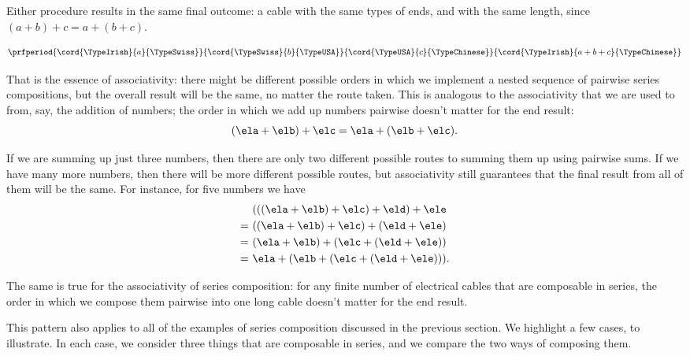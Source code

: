 Either procedure results in the same final outcome: a cable with the same types of ends, and with the same length, since $(a+b)+c = a+(b+c)$. 

\begin{equation}
    \label{eq:cables-assoc-all}
    \prfperiod{
        \cord{\TypeIrish}{a}{\TypeSwiss}
    }{
        \cord{\TypeSwiss}{b}{\TypeUSA}
    }{
        \cord{\TypeUSA}{c}{\TypeChinese}
    }{
        \cord{\TypeIrish}{a+b+c}{\TypeChinese}
    }
\end{equation}

That is the essence of associativity: there might be different possible orders in which we implement a nested sequence of pairwise series compositions, but the overall result will be the same, no matter the route taken. This is analogous to the associativity that we are used to from, say, the addition of numbers; the order in which we add up numbers pairwise doesn't matter for the end result:
\begin{equation}
    (\ela + \elb) + \elc = \ela + (\elb + \elc).
\end{equation}

If we are summing up just three numbers, then there are only two different possible routes to summing them up using pairwise sums. If we have many more numbers, then there will be more different possible routes, but associativity still guarantees that the final result from all of them will be the same. For instance, for five numbers we have
\begin{align*}
      & \ (((\ela + \elb) + \elc) + \eld) + \ele     \\
    = & \ ((\ela + \elb) + \elc) + (\eld + \ele)     \\
    = & \ (\ela + \elb) + (\elc + (\eld + \ele))     \\
    = & \ \ela + (\elb + (\elc + (\eld + \ele))).
\end{align*}

The same is true for the associativity of series composition: for any finite number of electrical cables that are composable in series, the order in which we compose them pairwise into one long cable doesn't matter for the end result.

This pattern also applies to all of the examples of series composition discussed in the previous section. We highlight a few cases, to illustrate. In each case, we consider three things that are composable in series, and we compare the two ways of composing them.

